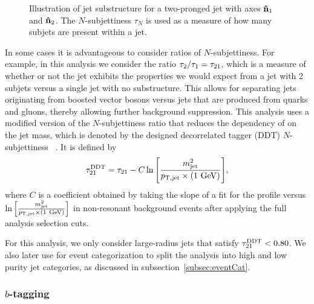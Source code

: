 \begin{figure}[htbp]
  \centering
  
  \caption{
    Illustration of jet substructure for a two-pronged jet with axes $\vb{\hat{n}}_1$ and $\vb{\hat{n}}_2$.
    The $N$-subjettiness $\tau_N$ is used as a measure of how many subjets are present within a jet.
  }
  \label{fig:jetSubstruct}
\end{figure}

In some cases it is advantageous to consider ratios of $N$-subjettiness.
For example, in this analysis we consider the ratio $\tau_2/\tau_1=\tau_{21}$, which is a measure of whether or not the jet exhibits the properties we would expect from a jet with 2 subjets versus a single jet with no substructure.
This allows for separating jets originating from boosted vector bosons versus jets that are produced from quarks and gluons, thereby allowing further background suppression.
This analysis uses a modified version of the $N$-subjettiness ratio that reduces the dependency of \nsubj on the jet mass, which is denoted by the designed decorrelated tagger (DDT) $N$-subjettiness \nsubjDDT~\cite{Dolen_2016}.
It is defined by
\begin{equation}
  \nsubjDDT=\nsubj-C\ln\bqty{\frac{\MJ^2}{\ptjet\times(1\unit{GeV})}},
\end{equation}
where $C$ is a coefficient obtained by taking the slope of a fit for the \nsubj profile versus $\ln\bqty{\frac{\MJ^2}{\ptjet\times(1\unit{GeV})}}$ in non-resonant \Wjets background events after applying the full analysis selection cuts.

For this analysis, we only consider large-radius jets that satisfy $\tau_{21}^\mathrm{DDT}<0.80$.
We also later use \nsubjDDT for event categorization to split the analysis into high and low purity jet categories, as discussed in subsection~\ref{subsec:eventCat}.

\subsubsection{$b$-tagging}


